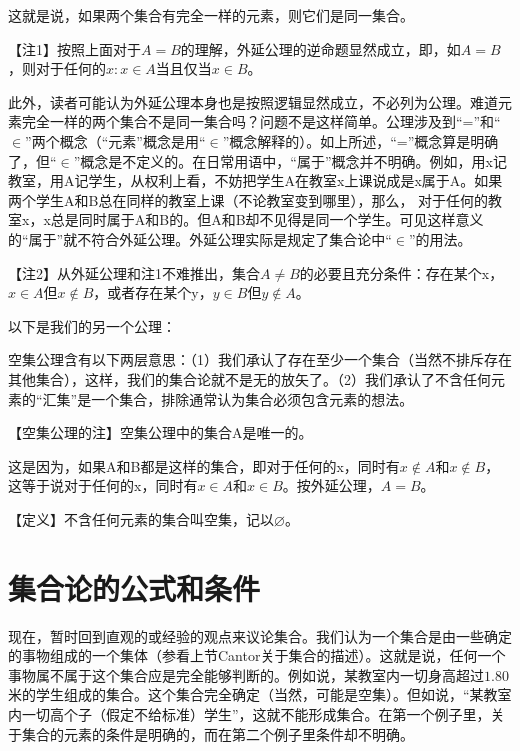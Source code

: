 

这就是说，如果两个集合有完全一样的元素，则它们是同一集合。

【注1】按照上面对于$A=B$的理解，外延公理的逆命题显然成立，即，如$A=B$，则对于任何的$x: x \in A$当且仅当$x \in B$。

此外，读者可能认为外延公理本身也是按照逻辑显然成立，不必列为公理。难道元素完全一样的两个集合不是同一集合吗？问题不是这样简单。公理涉及到“=”和“$\in$”两个概念（“元素”概念是用“$\in$”概念解释的）。如上所述，“=”概念算是明确了，但“$\in$”概念是不定义的。在日常用语中，“属于”概念并不明确。例如，用x记教室，用A记学生，从权利上看，不妨把学生A在教室x上课说成是x属于A。如果两个学生A和B总在同样的教室上课（不论教室变到哪里），那么， 对于任何的教室x，x总是同时属于A和B的。但A和B却不见得是同一个学生。可见这样意义的“属于”就不符合外延公理。外延公理实际是规定了集合论中“$\in$”的用法。

【注2】从外延公理和注1不难推出，集合$A \neq B$的必要且充分条件：存在某个x，$x \in A$但$x \notin B$，或者存在某个y，$y \in B$但$y \notin A$。

以下是我们的另一个公理：


空集公理含有以下两层意思：（1）我们承认了存在至少一个集合（当然不排斥存在其他集合），这样，我们的集合论就不是无的放矢了。（2）我们承认了不含任何元素的“汇集”是一个集合，排除通常认为集合必须包含元素的想法。

【空集公理的注】空集公理中的集合A是唯一的。

这是因为，如果A和B都是这样的集合，即对于任何的x，同时有$x \notin A$和$x \notin B$，这等于说对于任何的x，同时有$x \in A$和$x \in B$。按外延公理，$A=B$。

【定义】不含任何元素的集合叫空集，记以$\varnothing$。

\section{集合论的公式和条件}

现在，暂时回到直观的或经验的观点来议论集合。我们认为一个集合是由一些确定的事物组成的一个集体（参看上节Cantor关于集合的描述）。这就是说，任何一个事物属不属于这个集合应是完全能够判断的。例如说，某教室内一切身高超过$1.80$米的学生组成的集合。这个集合完全确定（当然，可能是空集）。但如说，“某教室内一切高个子（假定不给标准）学生”，这就不能形成集合。在第一个例子里，关于集合的元素的条件是明确的，而在第二个例子里条件却不明确。

